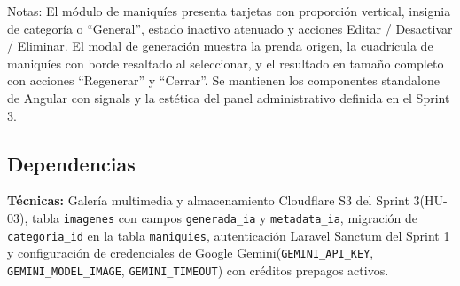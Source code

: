 \documentclass[12pt,a4paper]{article}
\begin{document}
\begin{center}

\vspace{0.4cm}


\vspace{0.4cm}

\end{center}

Notas: El módulo de maniquíes presenta tarjetas con proporción vertical, insignia de categoría o ``General'', estado inactivo atenuado y acciones Editar / Desactivar / Eliminar. El modal de generación muestra la prenda origen, la cuadrícula de maniquíes con borde resaltado al seleccionar, y el resultado en tamaño completo con acciones ``Regenerar'' y ``Cerrar''. Se mantienen los componentes standalone de Angular con signals y la estética del panel administrativo definida en el Sprint 3.

\subsection*{Dependencias}

\textbf{Técnicas:} Galería multimedia y almacenamiento Cloudflare S3 del Sprint 3(HU-03), tabla \texttt{imagenes} con campos \texttt{generada\_ia} y \texttt{metadata\_ia}, migración de \texttt{categoria\_id} en la tabla \texttt{maniquies}, autenticación Laravel Sanctum del Sprint 1 y configuración de credenciales de Google Gemini(\texttt{GEMINI\_API\_KEY}, \texttt{GEMINI\_MODEL\_IMAGE}, \texttt{GEMINI\_TIMEOUT}) con créditos prepagos activos.
\end{document}

